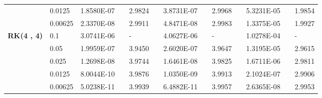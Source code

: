 \begin{table}[H]
\begin{tabular}{lllllrlrlrlrlrl}
\multicolumn{2}{l}{} & \multicolumn{2}{l}{0.0125} & 1.8580E-07 &       & 2.9824  &       & 3.8731E-07 &       & 2.9968  &       & 5.3231E-05 &       & 1.9854  \\
\multicolumn{2}{l}{} & \multicolumn{2}{l}{0.00625} & 2.3370E-08 &       & 2.9911  &       & 4.8471E-08 &       & 2.9983  &       & 1.3375E-05 &       & 1.9927  \\
\multicolumn{2}{l}{\multirow{5}[1]{*}{\textbf{RK(4 , 4)}}} & \multicolumn{2}{l}{0.1} & 3.0741E-06 &       & -     &       & 4.0627E-06 &       & -     &       & 1.0278E-04 &       & - \\
\multicolumn{2}{l}{} & \multicolumn{2}{l}{0.05} & 1.9959E-07 &       & 3.9450  &       & 2.6020E-07 &       & 3.9647  &       & 1.3195E-05 &       & 2.9615  \\
\multicolumn{2}{l}{} & \multicolumn{2}{l}{0.025} & 1.2698E-08 &       & 3.9744  &       & 1.6461E-08 &       & 3.9825  &       & 1.6711E-06 &       & 2.9811  \\
\multicolumn{2}{l}{} & \multicolumn{2}{l}{0.0125} & 8.0044E-10 &       & 3.9876  &       & 1.0350E-09 &       & 3.9913  &       & 2.1024E-07 &       & 2.9906  \\
\multicolumn{2}{l}{} & \multicolumn{2}{l}{0.00625} & 5.0238E-11 &       & 3.9939  &       & 6.4882E-11 &       & 3.9957  &       & 2.6365E-08 &       & 2.9953  \\
\bottomrule
\end{tabular}%
\label{tab_SAVRRK:6-4}%
\end{table}%
\vspace{-8mm}
